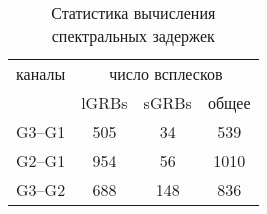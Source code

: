 \begin{table} [h]
 \centering
 \caption{Статистика вычисления спектральных задержек}
 \label{tab:lag_stat}
\scriptsize
  \begin{center}
  \begin{tabular}{c c c c}
  \hline
  \hline
каналы & \multicolumn{3}{c}{число всплесков} \\
       &  lGRBs        &    sGRBs    &   общее  \\       
\hline
G3--G1 &   505  & 34  &   539 \\ 
G2--G1 &   954  & 56  &  1010 \\ 
G3--G2 &   688  & 148 &   836 \\ 
\hline
\end{tabular}
\end{center}
\end{table}